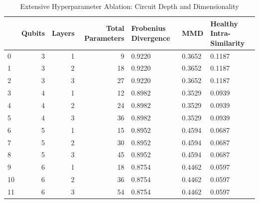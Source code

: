 \begin{table}
\caption{Extensive Hyperparameter Ablation: Circuit Depth and Dimensionality}
\label{tab:hyperparameter_grid}
\begin{tabular}{lrrrlll}
\toprule
 & Qubits & Layers & Total Parameters & Frobenius Divergence & MMD & Healthy Intra-Similarity \\
\midrule
0 & 3 & 1 & 9 & 0.9220 & 0.3652 & 0.1187 \\
1 & 3 & 2 & 18 & 0.9220 & 0.3652 & 0.1187 \\
2 & 3 & 3 & 27 & 0.9220 & 0.3652 & 0.1187 \\
3 & 4 & 1 & 12 & 0.8982 & 0.3529 & 0.0939 \\
4 & 4 & 2 & 24 & 0.8982 & 0.3529 & 0.0939 \\
5 & 4 & 3 & 36 & 0.8982 & 0.3529 & 0.0939 \\
6 & 5 & 1 & 15 & 0.8952 & 0.4594 & 0.0687 \\
7 & 5 & 2 & 30 & 0.8952 & 0.4594 & 0.0687 \\
8 & 5 & 3 & 45 & 0.8952 & 0.4594 & 0.0687 \\
9 & 6 & 1 & 18 & 0.8754 & 0.4462 & 0.0597 \\
10 & 6 & 2 & 36 & 0.8754 & 0.4462 & 0.0597 \\
11 & 6 & 3 & 54 & 0.8754 & 0.4462 & 0.0597 \\
\bottomrule
\end{tabular}
\end{table}
